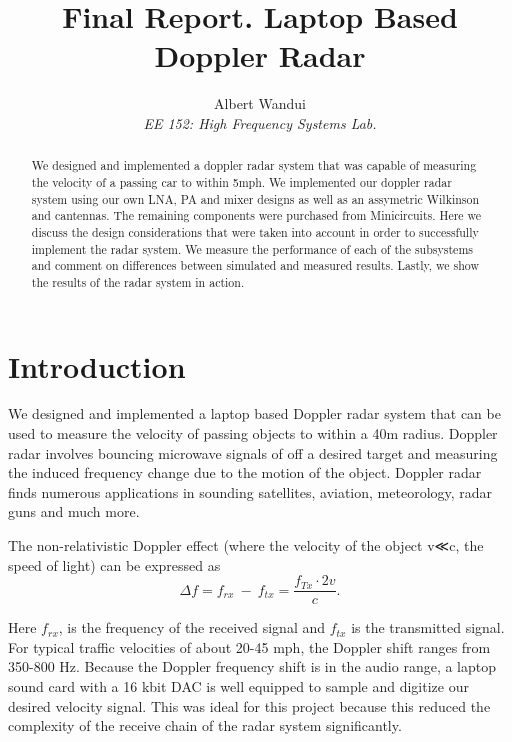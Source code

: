 \documentclass[reprint, aps, prl]{revtex4-1}
\begin{document}
\title{Final Report. Laptop Based Doppler Radar }
\author{Albert Wandui \\
\textit{EE 152: High Frequency Systems Lab.}}

\begin{abstract}
We designed and implemented a doppler radar system that was capable of measuring the velocity of a passing car to within 5mph. We implemented our doppler radar system using our own LNA, PA and mixer designs as well as an assymetric Wilkinson and cantennas. The remaining components were purchased from Minicircuits. Here we discuss the design considerations that were taken into account in order to successfully implement the radar system. We measure the performance of each of the subsystems and comment on differences between simulated and measured results. Lastly, we show the results of the radar system in action.
\end{abstract}

\maketitle





\section*{Introduction}\label{sec:introduction}

We designed and implemented a laptop based Doppler radar system that can be used to measure the velocity of passing objects to within a 40m radius. Doppler radar involves bouncing microwave signals of off a desired target and measuring the induced frequency change due to the motion of the object. Doppler radar finds numerous applications in sounding satellites, aviation, meteorology, radar guns and much more.

The non-relativistic Doppler effect (where the velocity of the object v≪c, the speed of light) can be expressed as 
\begin{equation}
\Delta f= f_{rx}\ -\ f_{tx} = \frac{f_{Tx} \cdot 2 v}{c}.
\end{equation}

Here $f_{rx}$, is the frequency of the received signal and $f_{tx}$ is the transmitted signal. For typical traffic velocities of about 20-45 mph, the Doppler shift ranges from 350-800 Hz. Because the Doppler frequency shift is in the audio range, a laptop sound card with a 16 kbit DAC is well equipped to sample and digitize our desired velocity signal. This was ideal for this project because this reduced the complexity of the receive chain of the radar system significantly.
\end{document}
